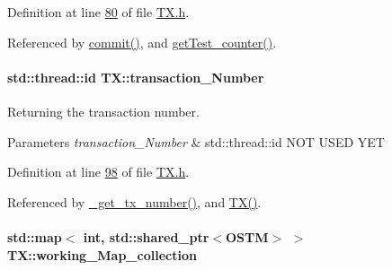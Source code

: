 Definition at line \hyperlink{_t_x_8h_source_l00080}{80} of file \hyperlink{_t_x_8h_source}{T\+X.\+h}.



Referenced by \hyperlink{_t_x_8cpp_source_l00202}{commit()}, and \hyperlink{_t_x_8cpp_source_l00324}{get\+Test\+\_\+counter()}.

\paragraph[{\texorpdfstring{transaction\+\_\+\+Number}{transaction_Number}}]{\setlength{\rightskip}{0pt plus 5cm}std\+::thread\+::id T\+X\+::transaction\+\_\+\+Number\hspace{0.3cm}{\ttfamily [private]}}\hypertarget{class_t_x_a145a1c74b521f277fe481971a930b249_a145a1c74b521f277fe481971a930b249}{}\label{class_t_x_a145a1c74b521f277fe481971a930b249_a145a1c74b521f277fe481971a930b249}


Returning the transaction number. 


\begin{DoxyParams}{Parameters}
{\em transaction\+\_\+\+Number} & std\+::thread\+::id N\+OT U\+S\+ED Y\+ET \\
\hline
\end{DoxyParams}


Definition at line \hyperlink{_t_x_8h_source_l00098}{98} of file \hyperlink{_t_x_8h_source}{T\+X.\+h}.



Referenced by \hyperlink{_t_x_8cpp_source_l00331}{\+\_\+get\+\_\+tx\+\_\+number()}, and \hyperlink{_t_x_8cpp_source_l00031}{T\+X()}.

\paragraph[{\texorpdfstring{working\+\_\+\+Map\+\_\+collection}{working_Map_collection}}]{\setlength{\rightskip}{0pt plus 5cm}std\+::map$<$ int, std\+::shared\+\_\+ptr$<${\bf O\+S\+TM}$>$ $>$ T\+X\+::working\+\_\+\+Map\+\_\+collection\hspace{0.3cm}{\ttfamily [private]}}\hypertarget{class_t_x_a81aafda16e2f20e36ec6c68e584668ff_a81aafda16e2f20e36ec6c68e584668ff}{}\label{class_t_x_a81aafda16e2f20e36ec6c68e584668ff_a81aafda16e2f20e36ec6c68e584668ff}


